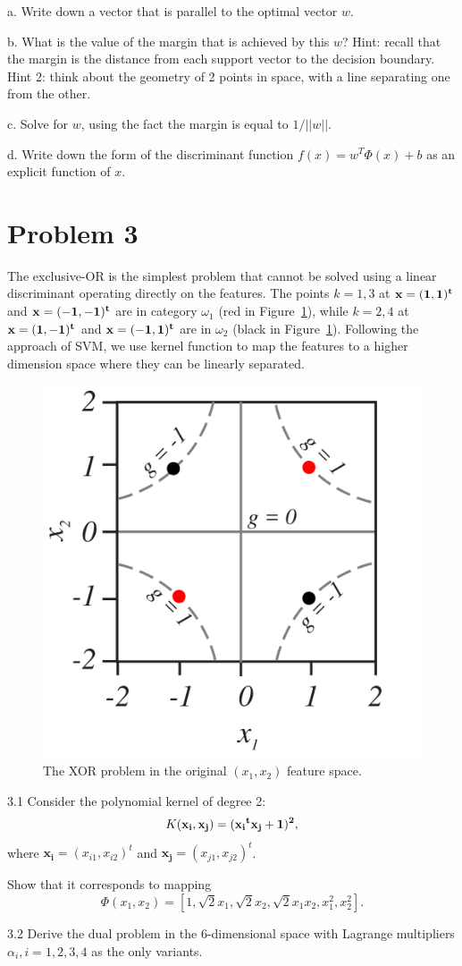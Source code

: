 \documentclass{article}
\theoremstyle{definition}
\theoremstyle{definition}
\theoremstyle{remark}
\begin{document}
a. Write down a vector that is parallel to the optimal vector $w$. 

b. What is the value of the margin that is achieved by this $w$? Hint: recall that the margin is the distance from each support vector to the decision boundary. Hint 2: think about the geometry of 2 points in space, with a line separating one from the other.

c. Solve for $w$, using the fact the margin is equal to $1/||w||$.

d. Write down the form of the discriminant function $ f(x) = w^T\Phi(x) + b$ as an explicit function of $x$.


\section*{Problem 3}
The exclusive-OR is the simplest problem that cannot be solved using a linear discriminant operating directly on the features. The points $k=1,3$ at $\bf{x}=(1,1)^t$ and $\bf{x}=(-1,-1)^t$ are in category $\omega_1$ (red in Figure~\ref{fig:xor}), while $k=2,4$ at $\bf{x}=(1,-1)^t$ and $\bf{x}=(-1,1)^t$ are in $\omega_2$ (black in Figure~\ref{fig:xor}). Following the approach of SVM, we use kernel function to map the features to a higher dimension space where they can be linearly separated.

\begin{figure}[htbp]
    \centering
    \includegraphics[width=0.3\linewidth]{XOR.PNG}
    \caption{The XOR problem in the original $(x_1,x_2)$ feature space.}
    \label{fig:xor}
\end{figure}

3.1 Consider the polynomial kernel of degree 2: 
\[K(\bf{x_i}, \bf{x_j}) = (\bf{x_i}^t\bf{x_j} + 1)^2,\] where $\boldsymbol{x_i} = (x_{i1}, x_{i2})^t$ and $\boldsymbol{x_j} = (x_{j1}, x_{j2})^t$.

Show that it corresponds to mapping 
\[\Phi(x_1, x_2) = [1, \sqrt{2}x_1, \sqrt{2}x_2, \sqrt{2}x_1x_2, x_1^2, x_2^2].\]

3.2 Derive the dual problem in the 6-dimensional space with Lagrange multipliers $\alpha_i, i=1,2,3,4$ as the only variants.
\end{document}
